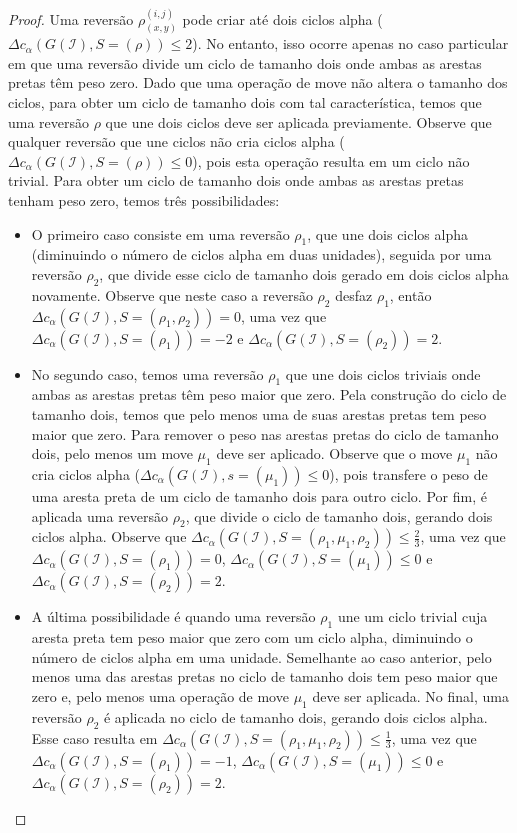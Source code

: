 \begin{proof}
Uma reversão $\rho_{(x,y)}^{(i,j)}$ pode criar até dois ciclos alpha ($\Delta c_{\alpha}(G(\mathcal{I}), S=(\rho)) \le 2$). No entanto, isso ocorre apenas no caso particular em que uma reversão divide um ciclo de tamanho dois onde ambas as arestas pretas têm peso zero. Dado que uma operação de move não altera o tamanho dos ciclos, para obter um ciclo de tamanho dois com tal característica, temos que uma reversão $\rho$ que une dois ciclos deve ser aplicada previamente. Observe que qualquer reversão que une ciclos não cria ciclos alpha ($\Delta c_{\alpha}(G(\mathcal{I}), S=(\rho)) \le 0$), pois esta operação resulta em um ciclo não trivial. Para obter um ciclo de tamanho dois onde ambas as arestas pretas tenham peso zero, temos três possibilidades:

\begin{itemize}
  \item O primeiro caso consiste em uma reversão $\rho_1$, que une dois ciclos alpha (diminuindo o número de ciclos alpha em duas unidades), seguida por uma reversão $\rho_2$, que divide esse ciclo de tamanho dois gerado em dois ciclos alpha novamente. Observe que neste caso a reversão $\rho_2$ desfaz $\rho_1$, então $\Delta c_{\alpha}(G(\mathcal{I}), S=(\rho_1,\rho_2)) = 0 $, uma vez que $\Delta c_{\alpha}(G(\mathcal{I}), S=(\rho_1)) = -2$ e $\Delta c_{\alpha}(G(\mathcal{I}), S=(\rho_2)) = 2$.
  \item No segundo caso, temos uma reversão $\rho_1$ que une dois ciclos triviais onde ambas as arestas pretas têm peso maior que zero. Pela construção do ciclo de tamanho dois, temos que pelo menos uma de suas arestas pretas tem peso maior que zero. Para remover o peso nas arestas pretas do ciclo de tamanho dois, pelo menos um move $\mu_1$ deve ser aplicado. Observe que o move $\mu_1$ não cria ciclos alpha ($\Delta c_{\alpha}(G(\mathcal{I}), s=(\mu_1)) \le 0$), pois transfere o peso de uma aresta preta de um ciclo de tamanho dois para outro ciclo. Por fim, é aplicada uma reversão $\rho_2$, que divide o ciclo de tamanho dois, gerando dois ciclos alpha. Observe que $\Delta c_{\alpha}(G(\mathcal{I}), S=(\rho_1,\mu_1,\rho_2)) \le \frac{2}{3}$, uma vez que $\Delta c_{ \alpha}(G(\mathcal{I}), S=(\rho_1)) = 0$, $\Delta c_{\alpha}(G(\mathcal{I}), S=(\mu_1)) \le 0$ e $\Delta c_{\alpha}(G(\mathcal{I}), S=(\rho_2)) = 2$.
  \item A última possibilidade é quando uma reversão $\rho_1$ une um ciclo trivial cuja aresta preta tem peso maior que zero com um ciclo alpha, diminuindo o número de ciclos alpha em uma unidade. Semelhante ao caso anterior, pelo menos uma das arestas pretas no ciclo de tamanho dois tem peso maior que zero e, pelo menos uma operação de move $\mu_1$ deve ser aplicada. No final, uma reversão $\rho_2$ é aplicada no ciclo de tamanho dois, gerando dois ciclos alpha. Esse caso resulta em $\Delta c_{\alpha}(G(\mathcal{I}), S=(\rho_1,\mu_1,\rho_2)) \le \frac{1}{3}$, uma vez que $\Delta c_{\alpha}(G(\mathcal{I}), S=(\rho_1)) = -1$, $\Delta c_{\alpha}(G(\mathcal{I}), S=(\mu_1)) \le 0$ e $\Delta c_{\alpha}(G(\mathcal{I}), S=(\rho_2)) = 2$.
\end{itemize}


\end{proof}
